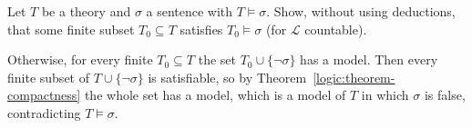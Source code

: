 \begin{exercise}\label{logic:exercise-finite-subset-proves}
Let $T$ be a theory and $\sigma$ a sentence with $T \models \sigma$. Show,
without using deductions, that some finite subset $T_0 \subseteq T$ satisfies
$T_0 \models \sigma$ (for $\mathcal{L}$ countable).
\end{exercise}

\begin{solution}
Otherwise, for every finite $T_0 \subseteq T$ the set $T_0 \cup \{\neg\sigma\}$
has a model. Then every finite subset of $T \cup \{\neg\sigma\}$ is satisfiable,
so by Theorem~\ref{logic:theorem-compactness} the whole set has a model, which is
a model of $T$ in which $\sigma$ is false, contradicting $T \models \sigma$.
\end{solution}
